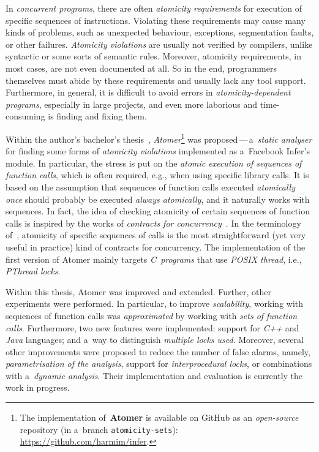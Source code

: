 In \emph{concurrent programs}, there are often \emph{atomicity requirements}
for execution of specific sequences of instructions. Violating these
requirements may cause many kinds of problems, such as unexpected behaviour,
exceptions, segmentation faults, or other failures. \emph{Atomicity violations}
are usually not verified by compilers, unlike syntactic or some sorts of
semantic rules. Moreover, atomicity requirements, in most cases, are not even
documented at all. So in the end, programmers themselves must abide by these
requirements and usually lack any tool support. Furthermore, in general, it
is difficult to avoid errors in \emph{atomicity-dependent programs},
especially in large projects, and even more laborious and time-consuming
is finding and fixing them.

Within the author's bachelor's thesis~\cite{harmimBP},
\emph{Atomer}\footnote{The implementation of~\textbf{Atomer} is available on
GitHub as an \emph{open-source} repository (in a~branch
\texttt{atomicity-sets}):
\url{https://github.com/harmim/infer}.} was proposed\,---\,a~\emph{static
analyser} for finding some forms of \emph{atomicity violations} implemented
as a~Facebook Infer's module. In particular, the stress is put on the
\emph{atomic execution of sequences of function calls}, which is often
required, e.g., when using specific library calls. It is based on the
assumption that sequences of function calls executed \emph{atomically once}
should probably be executed \emph{always atomically}, and it naturally works
with sequences. In fact, the idea of checking atomicity of certain sequences
of function calls is inspired by the works of \emph{contracts for
concurrency}~\cite{contracts2017, contracts2015}. In the terminology
of~\cite{contracts2017, contracts2015}, atomicity of specific sequences of
calls is the most straightforward (yet very useful in practice) kind of
contracts for concurrency. The implementation of the first version of Atomer
mainly targets \emph{C~programs} that use \emph{POSIX thread}, i.e.,
\emph{PThread locks}.

Within this thesis, Atomer was improved and extended. Further, other
experiments were performed. In particular, to improve \emph{scalability},
working with sequences of function calls was \emph{approximated} by working
with \emph{sets of function calls}. Furthermore, two new features were
implemented: support for \emph{C++} and \emph{Java} languages; and a~way to
distinguish \emph{multiple locks used}. Moreover, several other improvements
were proposed to reduce the number of false alarms, namely,
\emph{parametrisation of the analysis}, support for \emph{interprocedural
locks}, or combinations with a~\emph{dynamic analysis}. Their implementation
and evaluation is currently the work in progress.

